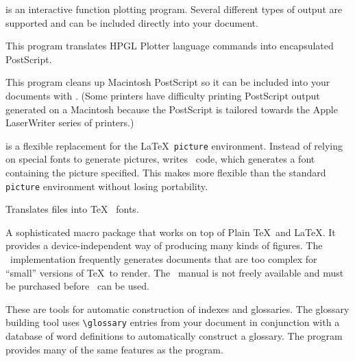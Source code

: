 
 is an interactive function plotting program.  Several
different types of output are supported and can be included directly
into your document.

\newpage
{}

This program translates HPGL Plotter language commands into encapsulated
PostScript.


This program cleans up Macintosh PostScript so it can be included
into your documents with .  (Some printers have difficulty
printing PostScript output generated on a Macintosh because the PostScript
is tailored towards the Apple LaserWriter series of printers.)


 is a flexible replacement for the \LaTeX\ \verb|picture|
environment.  Instead of relying on special fonts to generate pictures,
 writes \MF\ code, which generates a font containing the picture
specified.  This makes  more flexible than the standard
\verb|picture| environment without losing portability.


Translates  files into \TeX\  fonts.


A sophisticated macro package that works on top of Plain \TeX\
and \LaTeX.  It provides a device-independent way of producing many kinds
of figures.  The \PiCTeX\ implementation frequently generates documents that
are too complex for ``small'' versions of \TeX\ to render.  The \PiCTeX\
manual is not freely available and must be purchased before \PiCTeX\ can
be used.


These are tools for automatic construction of indexes and glossaries.  The
glossary building tool uses \verb|\glossary| entries from your document
in conjunction with a database of word definitions to automatically construct
a glossary.  The \program{idxtex} program provides many of the same features
as the \program{MakeIndex} program.



